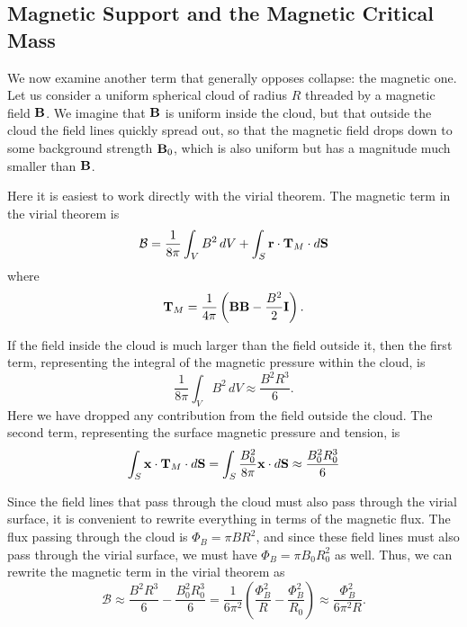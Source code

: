 \subsection{Magnetic Support and the Magnetic Critical Mass}

We now examine another term that generally opposes collapse: the magnetic one. Let us consider a uniform spherical cloud of radius $R$ threaded by a magnetic field $\mathbf{B}$. We imagine that $\mathbf{B}$ is uniform inside the cloud, but that outside the cloud the field lines quickly spread out, so that the magnetic field drops down to some background strength $\mathbf{B}_0$, which is also uniform but has a magnitude much smaller than $\mathbf{B}$.

Here it is easiest to work directly with the virial theorem. The magnetic term in the virial theorem is
\begin{equation}
\mathcal{B} = \frac{1}{8\pi} \int_V B^2 \,dV + \int_S \mathbf{r} \cdot \mathbf{T}_M \cdot d\mathbf{S}
\end{equation}
where
\begin{equation}
\mathbf{T}_M = \frac{1}{4\pi} \left(\mathbf{B}\mathbf{B} - \frac{B^2}{2}\mathbf{I}\right).
\end{equation}

If the field inside the cloud is much larger than the field outside it, then the first term, representing the integral of the magnetic pressure within the cloud, is
\begin{equation}
\frac{1}{8\pi} \int_V B^2\, dV \approx \frac{B^2 R^3}{6}.
\end{equation}
Here we have dropped any contribution from the field outside the cloud. The second term, representing the surface magnetic pressure and tension, is
\begin{equation}
\int_S \mathbf{x} \cdot \mathbf{T}_M \cdot d\mathbf{S} = \int_S \frac{B_0^2}{8\pi} \mathbf{x} \cdot d\mathbf{S}
\approx \frac{B_0^2 R_0^3}{6}
\end{equation}

Since the field lines that pass through the cloud must also pass through the virial surface, it is convenient to rewrite everything in terms of the magnetic flux. The flux passing through the cloud is $\Phi_B = \pi B R^2$, and since these field lines must also pass through the virial surface, we must have $\Phi_B = \pi B_0 R_0^2$ as well. Thus, we can rewrite the magnetic term in the virial theorem as
\begin{equation}
\mathcal{B} \approx \frac{B^2 R^3}{6} - \frac{B_0^2 R_0^3}{6} = \frac{1}{6\pi^2} \left(\frac{\Phi_B^2}{R} - \frac{\Phi_B^2}{R_0}\right) \approx \frac{\Phi_B^2}{6\pi^2 R}.
\end{equation}

